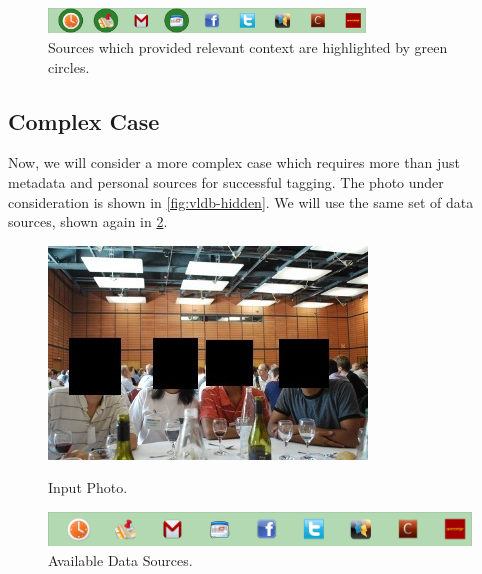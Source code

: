 \begin{figure}[h]
\centering
\includegraphics[width=0.75\textwidth]{media/chapter4/stacktrace/time-space-calendar-selected.png}
\caption{Sources which provided relevant context are highlighted by green circles.}
\label{fig:stacktrace-simple-all}
\end{figure}

\subsection{Complex Case}
Now, we will consider a more complex case which requires more than just metadata and personal sources for successful tagging. The photo under consideration is shown in \ref{fig:vldb-hidden}. We will use the same set of data sources, shown again in \ref{fig:vldb-sources}.

\begin{figure}[ht]
\begin{minipage}[b]{0.45\linewidth}
\centering
\includegraphics[width=\textwidth]{media/chapter4/stacktrace/vldb-hide-all.jpg}
\caption{Input Photo.}
\label{fig:vldb-hidden}
\end{minipage}
\hspace{0.5cm}
\begin{minipage}[b]{0.45\linewidth}
\centering
\includegraphics[width=\textwidth]{media/chapter4/stacktrace/sources.png}
\caption{Available Data Sources.}
\label{fig:vldb-sources}
\end{minipage}
\end{figure}

